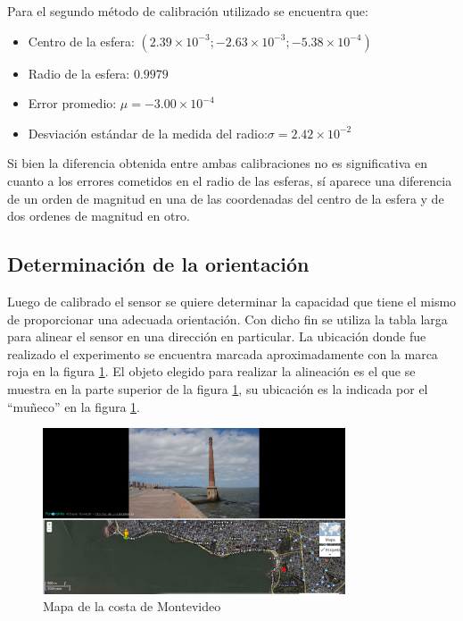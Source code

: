 \documentclass[main]{subfiles}
\begin{document}
Para el segundo método de calibración utilizado se encuentra que:
\begin{itemize}
\item Centro de la esfera: $(2.39\times10^{-3};-2.63\times10^{-3};-5.38\times10^{-4})$
\item Radio de la esfera: $0.9979$
\item Error promedio: $\mu =-3.00\times 10^{-4}$
\item Desviación estándar de la medida del radio:$\sigma = 2.42\times 10^{-2}$
\end{itemize}


Si bien la diferencia obtenida entre ambas calibraciones no es significativa en cuanto a los errores cometidos en el radio de las esferas, sí aparece una diferencia de un orden de magnitud en una de las coordenadas del centro de la esfera y de dos ordenes de magnitud en otro. 


\subsection{Determinaci\'on de la orientaci\'on}
Luego de calibrado el sensor se quiere determinar la capacidad que tiene el mismo de proporcionar una adecuada orientación. Con dicho fin se utiliza la tabla larga para alinear el sensor en una dirección en particular. La ubicación donde fue realizado el experimento se encuentra marcada aproximadamente con la marca roja en la figura \ref{fig:mapa}. El objeto elegido para realizar la alineación es el que se muestra en la parte superior de la figura \ref{fig:mapa}, su ubicación es la indicada por el ``mu\~neco'' en la figura \ref{fig:mapa}.
\begin{figure}
  \begin{center}
	\includegraphics[width=0.8\textwidth]
		{./pics_magneto/mapa.png}
	
  \end{center}
  \caption{Mapa de la costa de Montevideo}
  \label{fig:mapa}
\end{figure}
\end{document}
